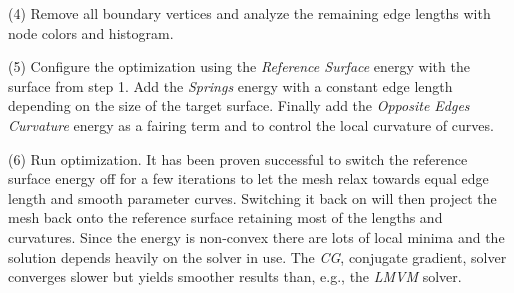 \documentclass[Thesis.tex]{subfiles}
\begin{document}
\begin{compactenum}[(1)]
\item[(4)] Remove all boundary vertices and analyze the remaining edge lengths with node colors and histogram.

\begin{center}
\begin{minipage}{0.9\linewidth}
            \centering
\end{minipage}
\end{center}   

\item[(5)] Configure the optimization using the \emph{Reference Surface} energy with the surface from step 1. Add the \emph{Springs} energy with a constant edge length depending on the size of the target surface. Finally add the \emph{Opposite Edges Curvature} energy as a fairing term and to control the local curvature of curves.

\begin{center}
\begin{minipage}{0.9\linewidth}
            \centering
\end{minipage}
\end{center}   

\item[(6)] Run optimization. It has been proven successful to switch the reference surface energy off for a few iterations to let the mesh relax towards equal edge length and smooth parameter curves. Switching it back on will then project the mesh back onto the reference surface retaining most of the lengths and curvatures. Since the energy is non-convex there are lots of local minima and the solution depends heavily on the solver in use. The \emph{CG}, conjugate gradient, solver converges slower but yields smoother results than, e.g., the \emph{LMVM} solver.

\end{compactenum}

\subfilebibliography
\end{document}
